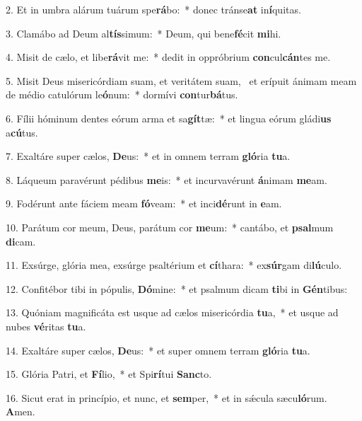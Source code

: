 2. Et in umbra alárum tuárum spe\textbf{rá}bo:~*  donec tránse\textbf{at} in\textbf{í}quitas.\

3. Clamábo ad Deum al\textbf{tís}simum:~*  Deum, qui bene\textbf{fé}cit \textbf{mi}hi.\

4. Misit de cælo, et libe\textbf{rá}vit me:~*  dedit in oppróbrium \textbf{con}cul\textbf{cán}tes me.\

5. Misit Deus misericórdiam suam, et veritátem suam, \dag\  et erípuit ánimam meam de médio catulórum le\textbf{ó}num:~*  dormívi \textbf{con}tur\textbf{bá}tus.\

6. Fílii hóminum dentes eórum arma et sa\textbf{gít}tæ:~*  et lingua eórum gládi\textbf{us} a\textbf{cú}tus.\

7. Exaltáre super cælos, \textbf{De}us:~*  et in omnem terram \textbf{gló}ria \textbf{tu}a.\

8. Láqueum paravérunt pédibus \textbf{me}is:~*  et incurvavérunt \textbf{á}nimam \textbf{me}am.\

9. Fodérunt ante fáciem meam \textbf{fó}veam:~*  et inci\textbf{dé}runt in \textbf{e}am.\

10. Parátum cor meum, Deus, parátum cor \textbf{me}um:~*  cantábo, et \textbf{psal}mum \textbf{di}cam.\

11. Exsúrge, glória mea, exsúrge psaltérium et \textbf{cí}thara:~*  ex\textbf{súr}gam di\textbf{lú}culo.\

12. Confitébor tibi in pópulis, \textbf{Dó}mine:~*  et psalmum dicam \textbf{ti}bi in \textbf{Gén}tibus:\

13. Quóniam magnificáta est usque ad cælos misericórdia \textbf{tu}a,~*  et usque ad nubes \textbf{vé}ritas \textbf{tu}a.\

14. Exaltáre super cælos, \textbf{De}us:~*  et super omnem terram \textbf{gló}ria \textbf{tu}a.\

15. Glória Patri, et \textbf{Fí}lio,~*  et Spi\textbf{rí}tui \textbf{Sanc}to.\

16. Sicut erat in princípio, et nunc, et \textbf{sem}per,~*  et in sǽcula sæcu\textbf{ló}rum. \textbf{A}men.\

